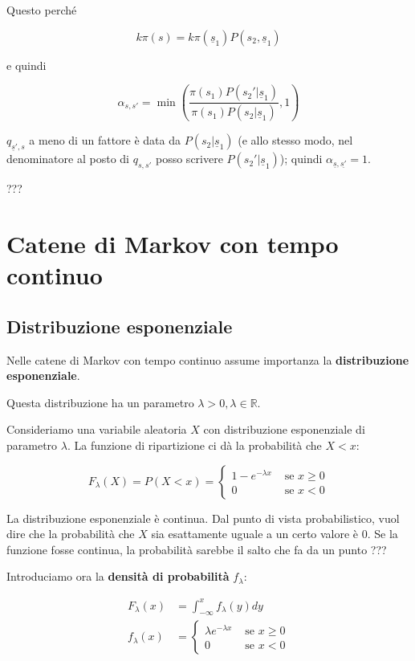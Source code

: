 \documentclass[a4paper,12pt]{book}
\begin{document}
Questo perché

$$ k\pi(s) = k\pi(\underline{s}_1)P(s_2, \underline{s}_1) $$ 

e quindi 

$$ \alpha_{s,s'} = \min \left(\frac{\pi(s_1)P(s_2' | \underline{s}_1)}{\pi(s_1)P(s_2 | \underline{s}_1)}, 1\right) $$

$ q_{\underline{s}', s} $ a meno di un fattore è data da $ P(s_2 | \underline{s}_1) $ (e allo stesso modo, nel denominatore al posto di $ q_{s,s'} $ posso scrivere $ P(s_2' | \underline{s}_1) $); quindi $\alpha_{\underline{s},\underline{s'}} = 1$. %

??? %

\chapter{Catene di Markov con tempo continuo}

\section{Distribuzione esponenziale}

Nelle catene di Markov con tempo continuo assume importanza la \textbf{distribuzione esponenziale}. 

Questa distribuzione ha un parametro $\lambda > 0, \lambda \in \mathbb{R}$. 

Consideriamo una variabile aleatoria $ X $ con distribuzione esponenziale di parametro $\lambda$. La funzione di ripartizione ci dà la probabilità che $ X < x $:

$$ F_\lambda (X) = P(X < x) = 
\begin{cases}
	1 - e^{ - \lambda x} & \text{ se } x \ge 0 \\
	0 & \text{ se } x < 0
\end{cases} $$

La distribuzione esponenziale è continua. Dal punto di vista probabilistico, vuol dire che la probabilità che $ X $ sia esattamente uguale a un certo valore è 0. Se la funzione fosse continua, la probabilità sarebbe il salto che fa da un punto ??? %

Introduciamo ora la \textbf{densità di probabilità} $ f_\lambda $:

\begin{align*}
	F_\lambda (x) & = \int_{-\infty}^{x} f_\lambda(y)dy \\
	f_\lambda (x) & = \begin{cases}
		\lambda e ^{-\lambda x} & \text{ se } x \ge 0 \\
		0 & \text{ se } x < 0
	\end{cases}
\end{align*}
\end{document}

